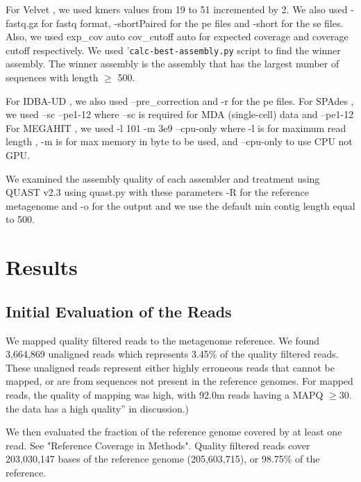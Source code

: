 For Velvet \cite{ velvet}, we used kmers values from 19 to 51
incremented by 2. We also used -fastq.gz for fastq format,
-shortPaired for the pe files and -short for the se files. Also, we
used \-exp\_cov auto \-cov\_cutoff auto for expected coverage and coverage cutoff respectively.  We used '{\tt calc-best-assembly.py} script to find the winner assembly. The winner assembly is the assembly that has the largest number of sequences  with length  $\geq$  500. 

For IDBA-UD \cite{idba},  we also used  --pre\_correction and -r for the pe files.
For SPAdes \cite{spades}, we used --sc --pe1-12   where --sc is required for MDA (single-cell) data  and --pe1-12 %
For MEGAHIT \cite{megahit}, we used -l 101 -m 3e9 --cpu-only where -l is for maximum read length , -m is for max memory in byte to be used, and --cpu-only to use CPU not GPU.


We examined the assembly quality of each assembler and treatment using
QUAST v2.3 \cite{quast} using quast.py with these parameters -R for the
reference metagenome and -o for the output and we use the default min
contig length equal to 500.


\section*{Results}

\subsection*{Initial Evaluation of the Reads}

We mapped quality filtered reads to the metagenome reference. 
We found 3,664,869 unaligned reads which represents 3.45\% of the
quality filtered reads.  These unaligned reads represent either highly
erroneous reads that cannot be mapped, or are from sequences not
present in the reference genomes.  For mapped reads, the quality of
mapping was high, with 92.0m reads having a MAPQ $\geq 30$.
the data has a high quality'' in discussion.)

We then evaluated the fraction of the reference genome covered by at
least one read. See "Reference Coverage in Methods". 
Quality filtered reads cover 203,030,147 bases of the reference genome
(205,603,715), or 98.75\% of the reference.

